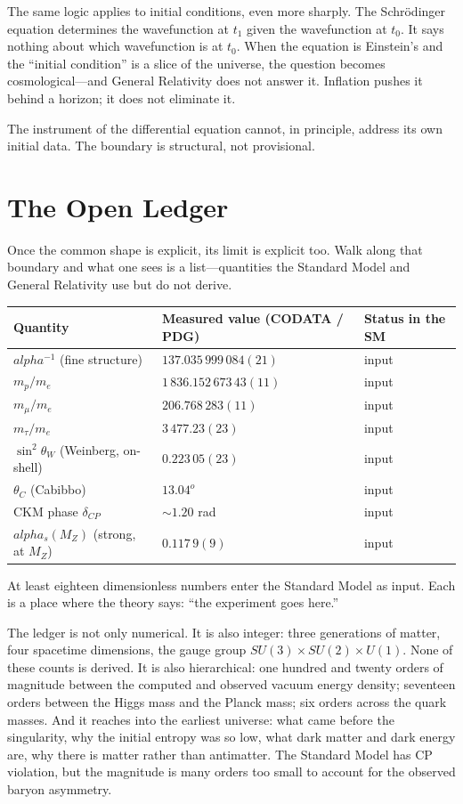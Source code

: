 \documentclass[11pt,a4paper]{book}
\def\alpha{alpha}%
\def\circ{o}%
\begin{document}
The same logic applies to initial conditions, even more sharply.  The Schr\"odinger equation determines the wavefunction at $t_1$ given the wavefunction at $t_0$.  It says nothing about which wavefunction is at $t_0$.  When the equation is Einstein's and the ``initial condition'' is a slice of the universe, the question becomes cosmological---and General Relativity does not answer it.  Inflation pushes it behind a horizon; it does not eliminate it.

The instrument of the differential equation cannot, in principle, address its own initial data.  The boundary is structural, not provisional.

\section*{The Open Ledger}
\label{sec:open-ledger}

Once the common shape is explicit, its limit is explicit too.  Walk along that boundary and what one sees is a list---quantities the Standard Model and General Relativity use but do not derive.

\begin{center}
\renewcommand{\arraystretch}{1.15}
\begin{tabular}{lll}
\toprule
\textbf{Quantity} & \textbf{Measured value (CODATA / PDG)} & \textbf{Status in the SM} \\
\midrule
$\alpha^{-1}$ (fine structure) & $137.035\,999\,084(21)$ & input \\
$m_p / m_e$ & $1\,836.152\,673\,43(11)$ & input \\
$m_\mu / m_e$ & $206.768\,283(11)$ & input \\
$m_\tau / m_e$ & $3\,477.23(23)$ & input \\
$\sin^2 \theta_W$ (Weinberg, on-shell) & $0.223\,05(23)$ & input \\
$\theta_C$ (Cabibbo) & $13.04^\circ$ & input \\
CKM phase $\delta_{CP}$ & $\sim 1.20$ rad & input \\
$\alpha_s(M_Z)$ (strong, at $M_Z$) & $0.117\,9(9)$ & input \\
\bottomrule
\end{tabular}
\end{center}

At least eighteen dimensionless numbers enter the Standard Model as input.  Each is a place where the theory says: ``the experiment goes here.''

The ledger is not only numerical.  It is also integer: three generations of matter, four spacetime dimensions, the gauge group $SU(3) \times SU(2) \times U(1)$.  None of these counts is derived.  It is also hierarchical: one hundred and twenty orders of magnitude between the computed and observed vacuum energy density; seventeen orders between the Higgs mass and the Planck mass; six orders across the quark masses.  And it reaches into the earliest universe: what came before the singularity, why the initial entropy was so low, what dark matter and dark energy are, why there is matter rather than antimatter.  The Standard Model has CP violation, but the magnitude is many orders too small to account for the observed baryon asymmetry.
\end{document}
